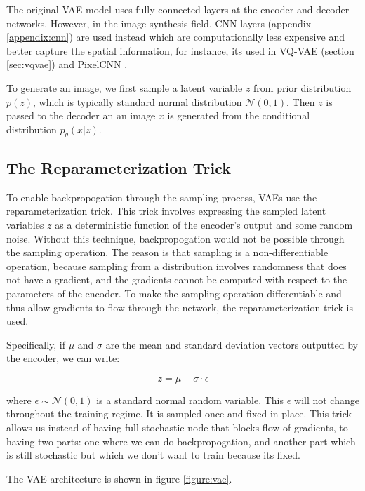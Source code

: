 The original VAE model uses fully connected layers at the encoder and decoder networks. However, in the image synthesis field, CNN layers (appendix \ref{appendix:cnn}) are used instead which are computationally less expensive and better capture the spatial information, for instance, its used in VQ-VAE (section \ref{sec:vqvae}) and PixelCNN \cite{pixelcnn}.

To generate an image, we first sample a latent variable $z$ from prior distribution $p(z)$, which is typically standard normal distribution $\mathcal{N}(0, 1)$. Then $z$ is passed to the decoder an an image $x$ is generated from the conditional distribution $p_\theta (x|z)$. 

\subsection{The Reparameterization Trick}
To enable backpropogation through the sampling process, VAEs use the reparameterization trick. This trick involves expressing the sampled latent variables $z$ as a deterministic function of the encoder's output and some random noise. Without this technique, backpropogation would not be possible through the sampling operation. The reason is that sampling is a non-differentiable operation, because sampling from a distribution involves randomness that does not have a gradient, and the gradients cannot be computed with respect to the parameters of the encoder. To make the sampling operation differentiable and thus allow gradients to flow through the network, the reparameterization trick is used. 

Specifically, if $\mu$ and $\sigma$ are the mean and standard deviation vectors outputted by the encoder, we can write:

\begin{equation}
    z = \mu + \sigma \cdot \epsilon
\end{equation}

where $\epsilon \sim \mathcal{N}(0, 1)$ is a standard normal random variable. This $\epsilon$ will not change throughout the training regime. It is sampled once and fixed in place. This trick allows us instead of having full stochastic node that blocks flow of gradients, to having two parts: one where we can do backpropogation, and another part which is still stochastic but which we don't want to train because its fixed.



The VAE architecture is shown in figure \ref{figure:vae}.

